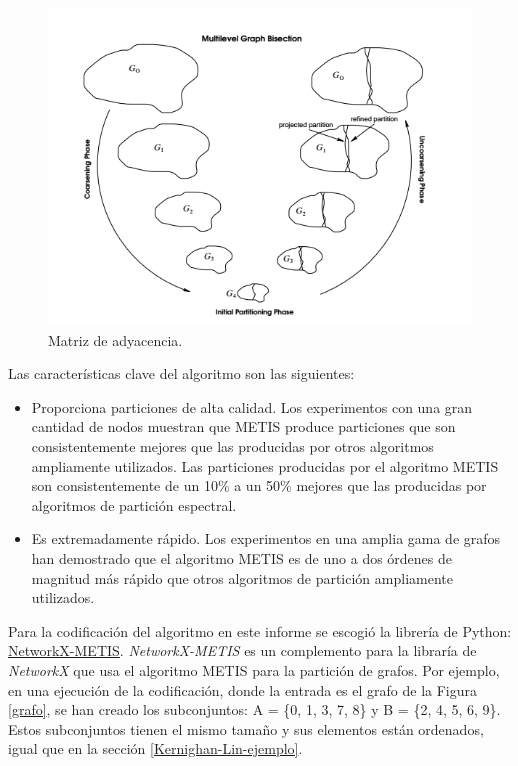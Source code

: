 \begin{figure}[h]
	\centering
	\includegraphics[scale=0.7]{Figures/metis}
	\vspace{1mm}
	\caption{Matriz de adyacencia.}
	\label{metis}
\end{figure}

Las características clave del algoritmo son las siguientes:

\begin{itemize}
	\item Proporciona particiones de alta calidad. Los experimentos con una gran cantidad de nodos muestran que METIS produce particiones que son consistentemente mejores que las producidas por otros algoritmos ampliamente utilizados. Las particiones producidas por el algoritmo METIS son consistentemente de un 10\% a un 50\% mejores que las producidas por algoritmos de partición espectral.
	\item Es extremadamente rápido. Los experimentos en una amplia gama de grafos han demostrado que el algoritmo METIS es de uno a dos órdenes de magnitud más rápido que otros algoritmos de partición ampliamente utilizados.
\end{itemize}

Para la codificación del algoritmo en este informe se escogió la librería de Python: \href{https://networkx-metis.readthedocs.io/en/latest/reference/generated/nxmetis.partition.html#nxmetis.partition}{NetworkX-METIS}. \textit{NetworkX-METIS} es un complemento para la libraría de \textit{NetworkX} que usa el algoritmo METIS para la partición de grafos. Por ejemplo, en una ejecución de la codificación, donde la entrada es el grafo de la Figura \ref{grafo}, se han creado los subconjuntos: A = \{0, 1, 3, 7, 8\} y B = \{2, 4, 5, 6, 9\}. Estos subconjuntos tienen el mismo tamaño y sus elementos están ordenados, igual que en la sección \ref{Kernighan-Lin-ejemplo}.